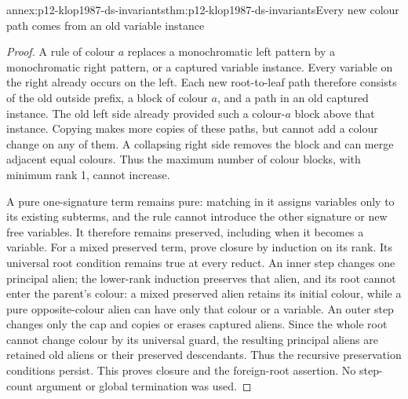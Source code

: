 \begin{annexitem}{annex:p12-klop1987-ds-invariants}{thm:p12-klop1987-ds-invariants}{Every new colour path comes from an old variable instance}
\begin{proof}
A rule of colour \(a\) replaces a monochromatic left pattern
by a monochromatic right pattern, or a captured variable instance.
Every variable on the right already occurs on the left. Each new
root-to-leaf path therefore consists of the old outside prefix,
a block of colour \(a\), and a path in an old captured instance.
The old left side already provided such a colour-\(a\) block
above that instance. Copying makes more copies of these paths,
but cannot add a colour change on any of them. A collapsing right
side removes the block and can merge adjacent equal colours.
Thus the maximum number of colour blocks, with minimum rank 1,
cannot increase.

A pure one-signature term remains pure: matching in it assigns
variables only to its existing subterms, and the rule cannot
introduce the other signature or new free variables. It therefore
remains preserved, including when it becomes a variable.
For a mixed preserved term, prove closure by induction on its rank.
Its universal root condition remains true at every reduct.
An inner step changes one principal alien; the lower-rank induction
preserves that alien, and its root cannot enter the parent's colour:
a mixed preserved alien retains its initial colour, while a pure
opposite-colour alien can have only that colour or a variable.
An outer step changes only the cap and copies or erases captured
aliens. Since the whole root cannot change colour by its universal
guard, the resulting principal aliens are retained old aliens or
their preserved descendants. Thus the recursive preservation
conditions persist. This proves closure and the foreign-root
assertion. No step-count argument or global termination was used.
\end{proof}
\end{annexitem}

